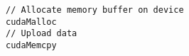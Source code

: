 \lstset{language=C++}
\begin{lstlisting}
// Allocate memory buffer on device
cudaMalloc
// Upload data
cudaMemcpy
\end{lstlisting}
